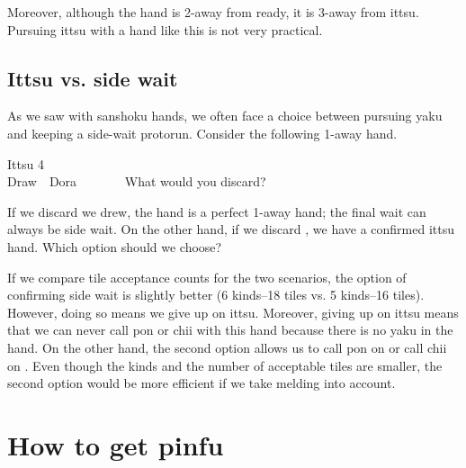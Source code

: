 \bigskip
Moreover, although the hand is 2-away from ready, it is 3-away from {\jap ittsu}. Pursuing {\jap ittsu} with a hand like this is not very practical.

\bigskip
\subsection{{\jap Ittsu} vs. side wait}
As we saw with {\jap sanshoku} hands, we often face a choice between pursuing {\jap yaku} and keeping a side-wait protorun. Consider the following 1-away hand.

\begin{itembox}[r]{{\jap Ittsu} 4}
\bp
{}~~\\
\hfill\footnotesize{Draw~~{\jap Dora}~~~~~~~}
\ep {}
\vspace{-15pt}What would you discard? \vspace{-5pt}
\end{itembox}
\noindent
If we discard {\LARGE{}} we drew, the hand is a perfect 1-away hand; the final wait can always be side wait. On the other hand, if we discard {\LARGE{}}, we have a confirmed {\jap ittsu} hand. Which option should we choose?

\bigskip
If we compare tile acceptance counts for the two scenarios, the option of confirming side wait is slightly better (6 kinds--18 tiles vs. 5 kinds--16 tiles). However, doing so means we give up on {\jap ittsu}. Moreover, giving up on {\jap ittsu} means that we can never call {\jap pon} or {\jap chii} with this hand because there is no {\jap yaku} in the hand. On the other hand, the second option allows us to call {\jap pon} on {\LARGE{}} or call {\jap chii} on {\LARGE{}}.
Even though the kinds and the number of acceptable tiles are smaller, the second option would be more efficient if we take melding into account.

\newpage
\section{How to get {\jap pinfu}} \label{sec:pinfu}



